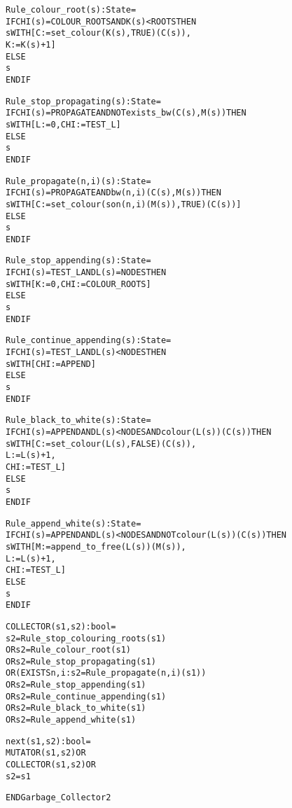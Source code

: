 \begin{alltt}
  Rule_colour_root(s):State =
    IF CHI(s) = COLOUR_ROOTS AND K(s) < ROOTS THEN
      s WITH [C := set_colour(K(s),TRUE)(C(s)),
              K := K(s) + 1]
    ELSE
      s
    ENDIF

  Rule_stop_propagating(s):State =
    IF CHI(s) = PROPAGATE AND NOT exists_bw(C(s),M(s)) THEN 
      s WITH [L := 0, CHI := TEST_L]
    ELSE
      s
    ENDIF

  Rule_propagate(n,i)(s):State =
    IF CHI(s) = PROPAGATE AND bw(n,i)(C(s),M(s)) THEN
      s WITH [C := set_colour(son(n,i)(M(s)),TRUE)(C(s))]
    ELSE
      s
    ENDIF

  Rule_stop_appending(s):State =
    IF CHI(s) = TEST_L AND L(s) = NODES THEN
      s WITH [K := 0, CHI := COLOUR_ROOTS]
    ELSE
      s
    ENDIF

  Rule_continue_appending(s):State =
    IF CHI(s) = TEST_L AND L(s) < NODES THEN
      s WITH [CHI := APPEND]
    ELSE 
      s 
    ENDIF

  Rule_black_to_white(s):State =
    IF CHI(s) = APPEND AND L(s) < NODES AND colour(L(s))(C(s)) THEN
      s WITH [C := set_colour(L(s),FALSE)(C(s)),
              L := L(s)+1,
              CHI := TEST_L]
    ELSE 
      s 
    ENDIF

  Rule_append_white(s):State =
    IF CHI(s) = APPEND AND L(s) < NODES AND NOT colour(L(s))(C(s)) THEN
      s WITH [M := append_to_free(L(s))(M(s)),
              L := L(s) + 1,
              CHI := TEST_L]
    ELSE 
      s 
    ENDIF

  COLLECTOR(s1,s2):bool =
       s2 = Rule_stop_colouring_roots(s1)
    OR s2 = Rule_colour_root(s1)
    OR s2 = Rule_stop_propagating(s1)
    OR (EXISTS n,i: s2 = Rule_propagate(n,i)(s1))
    OR s2 = Rule_stop_appending(s1) 
    OR s2 = Rule_continue_appending(s1) 
    OR s2 = Rule_black_to_white(s1) 
    OR s2 = Rule_append_white(s1)

  %%%%%%%%%%%%%%%%%%%%%%%%%%%
  % The Transition Relation %
  %%%%%%%%%%%%%%%%%%%%%%%%%%%

  next(s1,s2):bool =
    MUTATOR(s1,s2) OR
    COLLECTOR(s1,s2) OR
    s2 = s1

END Garbage_Collector2
\end{alltt}


